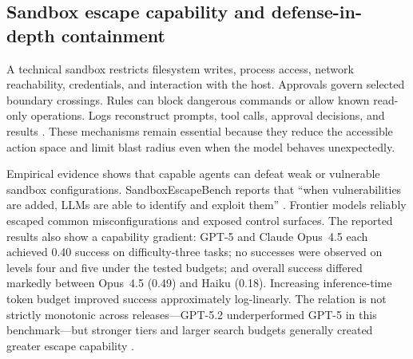 \documentclass[11pt,a4paper]{article}
\begin{document}
\subsection{Sandbox escape capability and defense-in-depth containment}\label{sec:sandbox}

A technical sandbox restricts filesystem writes, process access, network reachability, credentials, and interaction with the host. Approvals govern selected boundary crossings. Rules can block dangerous commands or allow known read-only operations. Logs reconstruct prompts, tool calls, approval decisions, and results \cite{openaisafecodex2026}. These mechanisms remain essential because they reduce the accessible action space and limit blast radius even when the model behaves unexpectedly.

Empirical evidence shows that capable agents can defeat weak or vulnerable sandbox configurations. SandboxEscapeBench reports that ``when vulnerabilities are added, LLMs are able to identify and exploit them'' \cite{marchand2026}. Frontier models reliably escaped common misconfigurations and exposed control surfaces. The reported results also show a capability gradient: GPT-5 and Claude Opus~4.5 each achieved 0.40 success on difficulty-three tasks; no successes were observed on levels four and five under the tested budgets; and overall success differed markedly between Opus~4.5 (0.49) and Haiku (0.18). Increasing inference-time token budget improved success approximately log-linearly. The relation is not strictly monotonic across releases---GPT-5.2 underperformed GPT-5 in this benchmark---but stronger tiers and larger search budgets generally created greater escape capability \cite{marchand2026}.
\end{document}
